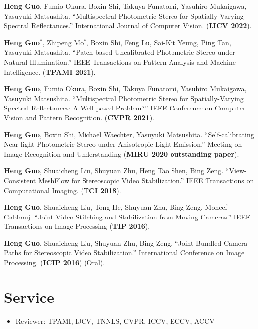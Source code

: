 \documentclass[UTF8]{ctexart}
\begin{document}
\begin{enumerate}[label={[\arabic*]}]
	\item \textbf{Heng Guo}, Fumio Okura, Boxin Shi, Takuya Funatomi, Yasuhiro Mukaigawa, Yasuyuki Matsushita. ``Multispectral Photometric Stereo for Spatially-Varying Spectral Reflectances.'' International Journal of Computer Vision. (\textbf{IJCV 2022}). 
	\item \textbf{Heng Guo$^*$}, Zhipeng Mo$^*$, Boxin Shi, Feng Lu, Sai-Kit Yeung, Ping Tan, Yasuyuki Matsushita. ``Patch-based Uncalibrated Photometric Stereo under Natural Illumination.'' 
	IEEE Transactions on Pattern Analysis and Machine Intelligence. (\textbf{TPAMI 2021}). 
	\item \textbf{Heng Guo}, Fumio Okura, Boxin Shi, Takuya Funatomi, Yasuhiro Mukaigawa, Yasuyuki Matsushita. ``Multispectral Photometric Stereo for Spatially-Varying Spectral Reflectances: A Well-posed Problem?'' IEEE Conference on Computer Vision and Pattern Recognition. (\textbf{CVPR 2021}). 
	\item \textbf{Heng Guo}, Boxin Shi, Michael Waechter, Yasuyuki Matsushita. ``Self-calibrating Near-light Photometric Stereo under Anisotropic Light Emission.'' Meeting on Image Recognition and Understanding (\textbf{MIRU 2020 outstanding paper}).  
	\item \textbf{Heng Guo}, Shuaicheng Liu, Shuyuan Zhu, Heng Tao Shen, Bing Zeng. ``View-Consistent MeshFlow for Stereoscopic Video Stabilization.'' IEEE Transactions on Computational Imaging. (\textbf{TCI 2018}).
	\item \textbf{Heng Guo}, Shuaicheng Liu, Tong He, Shuyuan Zhu, Bing Zeng, Moncef Gabbouj. ``Joint Video Stitching and Stabilization from Moving Cameras.'' IEEE Transactions on Image Processing (\textbf{TIP 2016}).
	\item \textbf{Heng Guo}, Shuaicheng Liu, Shuyuan Zhu, Bing Zeng. ``Joint Bundled Camera Paths for Stereoscopic Video Stabilization.'' International Conference on Image Processing. (\textbf{ICIP 2016}) (Oral).
	
\end{enumerate}

\section{Service}
\begin{itemize}[]
	\item Reviewer: TPAMI, IJCV, TNNLS, CVPR, ICCV, ECCV, ACCV 
\end{itemize}

\end{document}
